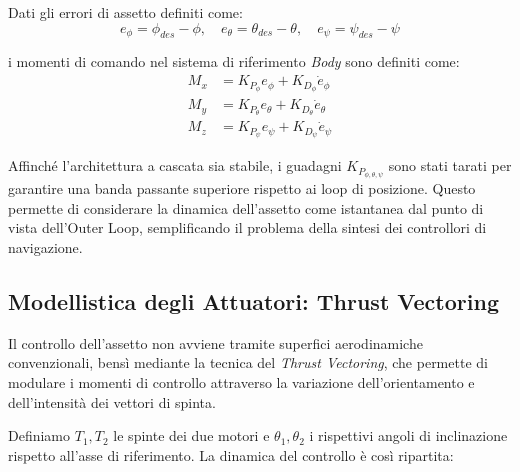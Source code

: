 Dati gli errori di assetto definiti come:
\begin{equation}
    e_\phi = \phi_{des} - \phi, \quad e_\theta = \theta_{des} - \theta, \quad e_\psi = \psi_{des} - \psi
\end{equation}

i momenti di comando nel sistema di riferimento \textit{Body} sono definiti come:
\begin{align}
    M_x &= K_{P_\phi} e_\phi + K_{D_\phi} \dot{e}_{\phi} \\
    M_y &= K_{P_\theta} e_\theta + K_{D_\theta} \dot{e}_{\theta} \\
    M_z &= K_{P_\psi} e_\psi + K_{D_\psi} \dot{e}_{\psi}
\end{align}

Affinché l'architettura a cascata sia stabile, i guadagni $K_{P_{\phi,\theta,\psi}}$ sono stati tarati per garantire una banda passante superiore rispetto ai loop di posizione. Questo permette di considerare la dinamica dell'assetto come istantanea dal punto di vista dell'Outer Loop, semplificando il problema della sintesi dei controllori di navigazione.


\subsection{Modellistica degli Attuatori: Thrust Vectoring}

Il controllo dell'assetto non avviene tramite superfici aerodinamiche convenzionali, bensì mediante la tecnica del \textit{Thrust Vectoring}, che permette di modulare i momenti di controllo attraverso la variazione dell'orientamento e dell'intensità dei vettori di spinta.

Definiamo $T_1, T_2$ le spinte dei due motori e $\theta_1, \theta_2$ i rispettivi angoli di inclinazione rispetto all'asse di riferimento. La dinamica del controllo è così ripartita:

